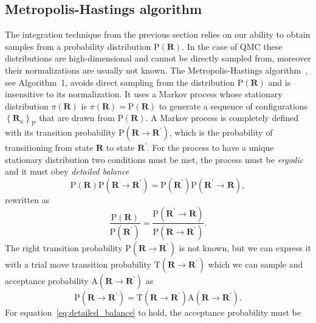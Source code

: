 \documentclass[final,3p,times,twocolumn]{elsarticle}
\begin{document}
	\subsection{Metropolis-Hastings algorithm}
		\label{subsec:Impl-MCMC}
	The integration technique from the previous section relies on our ability to obtain samples from a probability distribution $\mathrm{P}(\mathbf{R})$. In the case of QMC these distributions are high-dimensional and cannot be directly sampled from, moreover their normalizations are usually not known. 
	The Metropolis-Hastings algorithm~\cite{hastings1970monte}, see Algorithm~1, avoids direct sampling from the distribution $\mathrm{P}(\mathbf{R})$ and is insensitive to its normalization. It uses a Markov process whose stationary distribution $\pi(\mathbf{R})$ is $\pi(\mathbf{R}) = \mathrm{P}(\mathbf{R})$	
	to generate a sequence of configurations $\left\{\mathbf{R}_n\right\}_\mathrm{P}$ 
	that are drawn from $\mathrm{P}(\mathbf{R})$. A Markov process is completely defined with its transition probability $\mathrm{P}(\mathbf{R} \rightarrow \mathbf{R}^\prime)$, which is the probability of transitioning from state $\mathbf{R}$ to state $\mathbf{R}^\prime$. For the process to have a unique stationary distribution two conditions must be met, the process must be \emph{ergodic} and it must obey \emph{detailed balance}
	\begin{equation}
		\mathrm{P}(\mathbf{R}) \mathrm P(\mathbf{R} \rightarrow \mathbf{R}^\prime) = \mathrm{P}(\mathbf{R}^\prime) \mathrm P(\mathbf{R}^\prime \rightarrow \mathbf{R}),
	\end{equation}
	rewritten as
	\begin{equation}
		\label{eq:detailed_balance}
		\frac{\mathrm P ({\mathbf{R}})}{\mathrm P ({\mathbf{R}^\prime})} = \frac{\mathrm P(\mathbf{R}^\prime \rightarrow \mathbf{R})}{\mathrm P(\mathbf{R} \rightarrow \mathbf{R}^\prime)}.
	\end{equation}
	The right transition probability $\mathrm P(\mathbf{R} \rightarrow \mathbf{R}^\prime)$ is not known, but we can express it with a trial move transition probability $\mathrm{T}(\mathbf{R} \rightarrow \mathbf{R}^\prime)$ which we can sample and acceptance probability $\mathrm{A}(\mathbf{R} \rightarrow \mathbf{R}^\prime)$ as
	\begin{equation}
		\mathrm P(\mathbf{R} \rightarrow \mathbf{R}^\prime) = \mathrm T(\mathbf{R} \rightarrow \mathbf{R}^\prime) \mathrm A(\mathbf{R} \rightarrow \mathbf{R}^\prime).
	\end{equation}
	For equation~\eqref{eq:detailed_balance} to hold, the acceptance probability must be 
\end{document}
